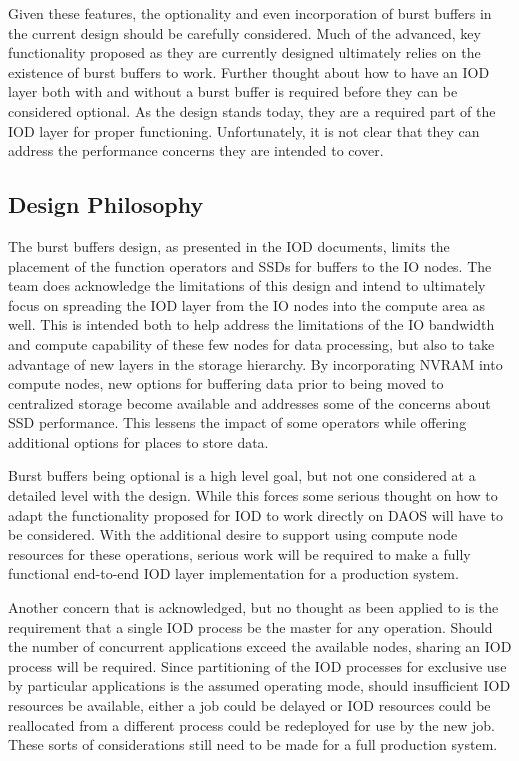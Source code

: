 \documentclass[conference]{IEEEtran}
\begin{document}
Given these features, the optionality and even incorporation of burst buffers
in the current design should be carefully considered. Much of the advanced, key
functionality proposed as they are currently designed ultimately relies on the
existence of burst buffers to work. Further thought about how to have an IOD
layer both with and without a burst buffer is required before they can be
considered optional. As the design stands today, they are a required part of
the IOD layer for proper functioning. Unfortunately, it is not clear that they
can address the performance concerns they are intended to cover.

\subsection{Design Philosophy}
The burst buffers design, as presented in the IOD documents, limits the
placement of the function operators and SSDs for buffers to the IO nodes. The
team does acknowledge the limitations of this design and intend to ultimately
focus on spreading the IOD layer from the IO nodes into the compute area as
well.  This is intended both to help address the limitations of the IO
bandwidth and compute capability of these few nodes for data processing, but
also to take advantage of new layers in the storage hierarchy. By incorporating
NVRAM into compute nodes, new options for buffering data prior to being moved
to centralized storage become available and addresses some of the concerns
about SSD performance. This lessens the impact of some operators while offering
additional options for places to store data.

Burst buffers being optional is a high level goal, but not one considered at a
detailed level with the design. While this forces some serious thought on how
to adapt the functionality proposed for IOD to work directly on DAOS will have
to be considered. With the additional desire to support using compute node
resources for these operations, serious work will be required to make a fully
functional end-to-end IOD layer implementation for a production system.

Another concern that is acknowledged, but no thought as been applied to is the
requirement that a single IOD process be the master for any operation. Should
the number of concurrent applications exceed the available nodes, sharing an
IOD process will be required. Since partitioning of the IOD processes for
exclusive use by particular applications is the assumed operating mode, should
insufficient IOD resources be available, either a job could be delayed or IOD
resources could be reallocated from a different process could be redeployed for
use by the new job. These sorts of considerations still need to be made for a
full production system.
\end{document}
